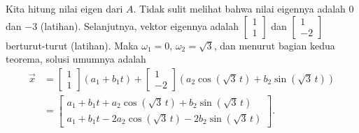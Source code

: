 \begin{example}
Kita hitung nilai eigen dari $A$.  Tidak sulit melihat bahwa nilai eigennya
adalah 0 dan $-3$ (latihan).  Selanjutnya,
vektor eigennya adalah
$\left[ \begin{smallmatrix} 1 \\ 1 \end{smallmatrix} \right]$ dan
$\left[ \begin{smallmatrix} 1 \\ -2 \end{smallmatrix} \right]$ berturut-turut
(latihan). 
Maka
$\omega_1 = 0$,
$\omega_2 = \sqrt{3}$, dan menurut bagian kedua teorema,
solusi umumnya adalah
\begin{equation*}
\begin{split}
\vec{x} & = 
\begin{bmatrix} 1 \\ 1 \end{bmatrix}
\left( a_1 + b_1 t \right) 
+
\begin{bmatrix} 1 \\ -2 \end{bmatrix}
\left( a_2 \cos ( \sqrt{3} \, t) + b_2 \sin ( \sqrt{3} \, t ) \right)
\\
& =
\begin{bmatrix}
a_1 + b_1 t + a_2 \cos ( \sqrt{3} \, t ) + b_2 \sin ( \sqrt{3} \, t
) \\
a_1 + b_1 t - 2 a_2 \cos ( \sqrt{3} \, t ) - 2 b_2 \sin ( \sqrt{3}
\, t ) 
\end{bmatrix} .
\end{split}
\end{equation*}


\end{example}
